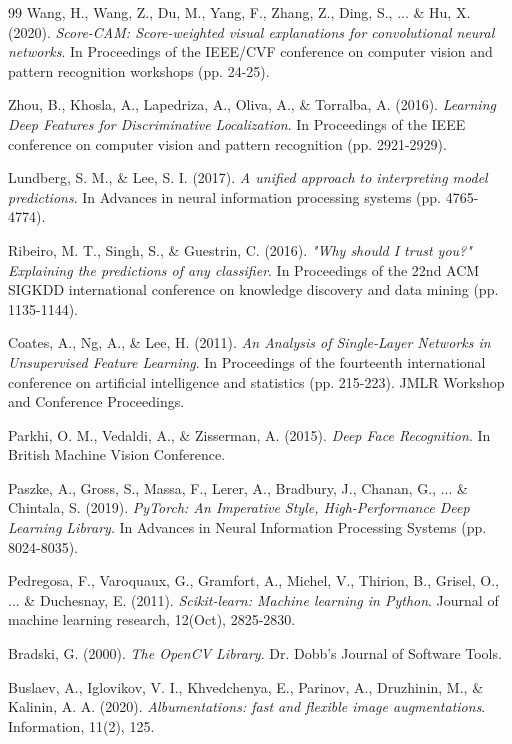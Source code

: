\begin{thebibliography}{99}
Wang, H., Wang, Z., Du, M., Yang, F., Zhang, Z., Ding, S., ... \& Hu, X. (2020). 
\textit{Score-CAM: Score-weighted visual explanations for convolutional neural networks}. 
In Proceedings of the IEEE/CVF conference on computer vision and pattern recognition workshops (pp. 24-25).

Zhou, B., Khosla, A., Lapedriza, A., Oliva, A., \& Torralba, A. (2016). 
\textit{Learning Deep Features for Discriminative Localization}. 
In Proceedings of the IEEE conference on computer vision and pattern recognition (pp. 2921-2929).

Lundberg, S. M., \& Lee, S. I. (2017). 
\textit{A unified approach to interpreting model predictions}. 
In Advances in neural information processing systems (pp. 4765-4774).

Ribeiro, M. T., Singh, S., \& Guestrin, C. (2016). 
\textit{"Why should I trust you?" Explaining the predictions of any classifier}. 
In Proceedings of the 22nd ACM SIGKDD international conference on knowledge discovery and data mining (pp. 1135-1144).


Coates, A., Ng, A., \& Lee, H. (2011). 
\textit{An Analysis of Single-Layer Networks in Unsupervised Feature Learning}. 
In Proceedings of the fourteenth international conference on artificial intelligence and statistics (pp. 215-223). JMLR Workshop and Conference Proceedings.

Parkhi, O. M., Vedaldi, A., \& Zisserman, A. (2015). 
\textit{Deep Face Recognition}. 
In British Machine Vision Conference.


Paszke, A., Gross, S., Massa, F., Lerer, A., Bradbury, J., Chanan, G., ... \& Chintala, S. (2019). 
\textit{PyTorch: An Imperative Style, High-Performance Deep Learning Library}. 
In Advances in Neural Information Processing Systems (pp. 8024-8035).

Pedregosa, F., Varoquaux, G., Gramfort, A., Michel, V., Thirion, B., Grisel, O., ... \& Duchesnay, E. (2011). 
\textit{Scikit-learn: Machine learning in Python}. 
Journal of machine learning research, 12(Oct), 2825-2830.

Bradski, G. (2000). 
\textit{The OpenCV Library}. 
Dr. Dobb's Journal of Software Tools.

Buslaev, A., Iglovikov, V. I., Khvedchenya, E., Parinov, A., Druzhinin, M., \& Kalinin, A. A. (2020). 
\textit{Albumentations: fast and flexible image augmentations}. 
Information, 11(2), 125.

\end{thebibliography}
